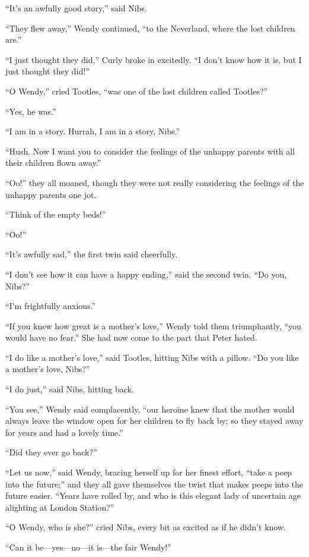 ``It's an awfully good story,'' said Nibs.

``They flew away,'' Wendy continued, ``to the Neverland, where the lost
children are.''

``I just thought they did,'' Curly broke in excitedly. ``I don't know how
it is, but I just thought they did!''

``O Wendy,'' cried Tootles, ``was one of the lost children called
Tootles?''

``Yes, he was.''

``I am in a story. Hurrah, I am in a story, Nibs.''

``Hush. Now I want you to consider the feelings of the unhappy parents
with all their children flown away.''

``Oo!'' they all moaned, though they were not really considering the
feelings of the unhappy parents one jot.

``Think of the empty beds!''

``Oo!''

``It's awfully sad,'' the first twin said cheerfully.

``I don't see how it can have a happy ending,'' said the second twin. ``Do
you, Nibs?''

``I'm frightfully anxious.''

``If you knew how great is a mother's love,'' Wendy told them
triumphantly, ``you would have no fear.'' She had now come to the part
that Peter hated.

``I do like a mother's love,'' said Tootles, hitting Nibs with a pillow.
``Do you like a mother's love, Nibs?''

``I do just,'' said Nibs, hitting back.

``You see,'' Wendy said complacently, ``our heroine knew that the mother
would always leave the window open for her children to fly back by; so
they stayed away for years and had a lovely time.''

``Did they ever go back?''

``Let us now,'' said Wendy, bracing herself up for her finest effort,
``take a peep into the future;'' and they all gave themselves the twist
that makes peeps into the future easier. ``Years have rolled by, and who
is this elegant lady of uncertain age alighting at London Station?''

``O Wendy, who is she?'' cried Nibs, every bit as excited as if he didn't
know.

``Can it be—yes—no—it is—the fair Wendy!''

